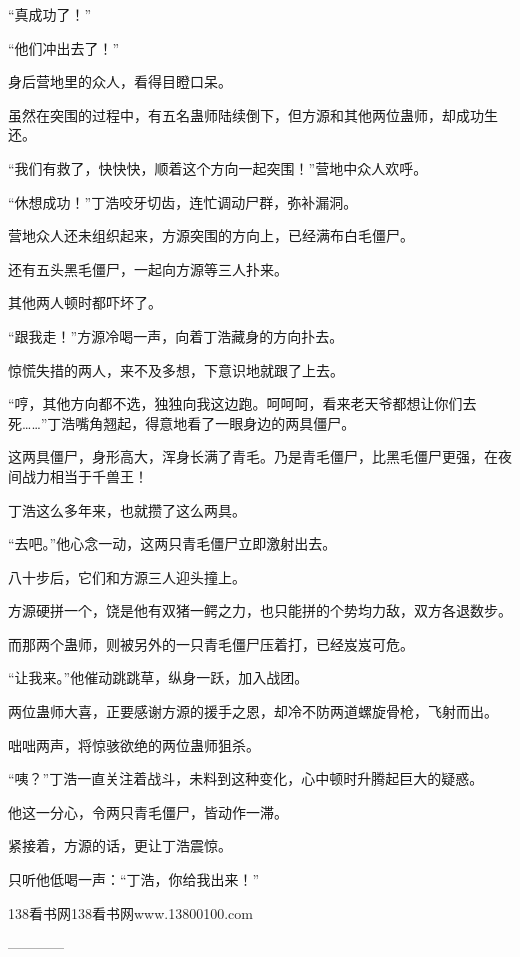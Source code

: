 \begin{this_body}
“真成功了！”

“他们冲出去了！”

身后营地里的众人，看得目瞪口呆。

虽然在突围的过程中，有五名蛊师陆续倒下，但方源和其他两位蛊师，却成功生还。

“我们有救了，快快快，顺着这个方向一起突围！”营地中众人欢呼。

“休想成功！”丁浩咬牙切齿，连忙调动尸群，弥补漏洞。

营地众人还未组织起来，方源突围的方向上，已经满布白毛僵尸。

还有五头黑毛僵尸，一起向方源等三人扑来。

其他两人顿时都吓坏了。

“跟我走！”方源冷喝一声，向着丁浩藏身的方向扑去。

惊慌失措的两人，来不及多想，下意识地就跟了上去。

“哼，其他方向都不选，独独向我这边跑。呵呵呵，看来老天爷都想让你们去死……”丁浩嘴角翘起，得意地看了一眼身边的两具僵尸。

这两具僵尸，身形高大，浑身长满了青毛。乃是青毛僵尸，比黑毛僵尸更强，在夜间战力相当于千兽王！

丁浩这么多年来，也就攒了这么两具。

“去吧。”他心念一动，这两只青毛僵尸立即激射出去。

八十步后，它们和方源三人迎头撞上。

方源硬拼一个，饶是他有双猪一鳄之力，也只能拼的个势均力敌，双方各退数步。

而那两个蛊师，则被另外的一只青毛僵尸压着打，已经岌岌可危。

“让我来。”他催动跳跳草，纵身一跃，加入战团。

两位蛊师大喜，正要感谢方源的援手之恩，却冷不防两道螺旋骨枪，飞射而出。

咄咄两声，将惊骇欲绝的两位蛊师狙杀。

“咦？”丁浩一直关注着战斗，未料到这种变化，心中顿时升腾起巨大的疑惑。

他这一分心，令两只青毛僵尸，皆动作一滞。

紧接着，方源的话，更让丁浩震惊。

只听他低喝一声：“丁浩，你给我出来！”

138看书网138看书网www.13800100.com

------------

\end{this_body}

